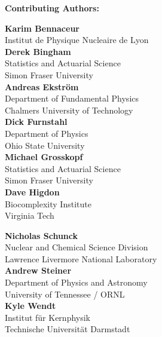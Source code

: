 {\bf \large Contributing Authors:}
\vspace{5mm}

\begin{minipage}[t]{0.5\linewidth}

\textbf{Karim Bennaceur}\\
Institut de Physique Nucleaire de Lyon\\

\textbf{Derek Bingham}\\
Statistics and Actuarial Science\\
Simon Fraser University\\

\textbf{Andreas Ekström}\\
Department of Fundamental Physics\\
Chalmers University of Technology\\

\textbf{Dick Furnstahl}\\
Department of Physics\\ 
Ohio State University\\

\textbf{Michael Grosskopf}\\
Statistics and Actuarial Science\\
Simon Fraser University\\

\textbf{Dave Higdon}\\
Biocomplexity Institute\\
Virginia Tech


\end{minipage}
\hfill
\begin{minipage}[t]{0.5\linewidth}

{\bf Nicholas Schunck}\\
Nuclear and Chemical Science Division \\
Lawrence Livermore National Laboratory\\

{\bf Andrew Steiner}\\
Department of Physics and Astronomy\\
University of Tennessee / ORNL\\

{\bf Kyle Wendt}\\
Institut für Kernphysik\\
Technische Universität Darmstadt \\

\end{minipage}

